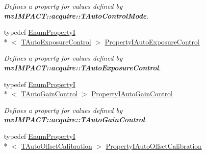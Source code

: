 \begin{DoxyCompactItemize}
\begin{DoxyCompactList}\small\item\em Defines a property for values defined by {\bfseries mv\+I\+M\+P\+A\+C\+T\+::acquire\+::\+T\+Auto\+Control\+Mode}. \end{DoxyCompactList}\item 
\hypertarget{group___device_specific_interface_ga5223682df43da3c6e83d7c8382189d7c}{typedef \hyperlink{classmv_i_m_p_a_c_t_1_1acquire_1_1_enum_property_i}{Enum\+Property\+I}\\*
$<$ \hyperlink{group___device_specific_interface_gaa3925d7c57549537aff5ba88e4663d1a}{T\+Auto\+Exposure\+Control} $>$ \hyperlink{group___device_specific_interface_ga5223682df43da3c6e83d7c8382189d7c}{Property\+I\+Auto\+Exposure\+Control}}\label{group___device_specific_interface_ga5223682df43da3c6e83d7c8382189d7c}

\begin{DoxyCompactList}\small\item\em Defines a property for values defined by {\bfseries mv\+I\+M\+P\+A\+C\+T\+::acquire\+::\+T\+Auto\+Exposure\+Control}. \end{DoxyCompactList}\item 
\hypertarget{group___device_specific_interface_ga6489a23af699da0b3a1f151c966ab906}{typedef \hyperlink{classmv_i_m_p_a_c_t_1_1acquire_1_1_enum_property_i}{Enum\+Property\+I}\\*
$<$ \hyperlink{group___device_specific_interface_ga5b3b072118cc04a2868720d230315c3a}{T\+Auto\+Gain\+Control} $>$ \hyperlink{group___device_specific_interface_ga6489a23af699da0b3a1f151c966ab906}{Property\+I\+Auto\+Gain\+Control}}\label{group___device_specific_interface_ga6489a23af699da0b3a1f151c966ab906}

\begin{DoxyCompactList}\small\item\em Defines a property for values defined by {\bfseries mv\+I\+M\+P\+A\+C\+T\+::acquire\+::\+T\+Auto\+Gain\+Control}. \end{DoxyCompactList}\item 
\hypertarget{group___device_specific_interface_gac5eea380ea812d37bc6562246cdff73d}{typedef \hyperlink{classmv_i_m_p_a_c_t_1_1acquire_1_1_enum_property_i}{Enum\+Property\+I}\\*
$<$ \hyperlink{group___device_specific_interface_ga56384be04e2e0eccd6349fa8bc18d59a}{T\+Auto\+Offset\+Calibration} $>$ \hyperlink{group___device_specific_interface_gac5eea380ea812d37bc6562246cdff73d}{Property\+I\+Auto\+Offset\+Calibration}}\label{group___device_specific_interface_gac5eea380ea812d37bc6562246cdff73d}


\end{DoxyCompactItemize}
